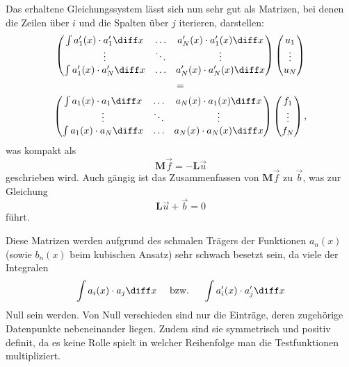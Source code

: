 Das erhaltene Gleichungssystem lässt sich nun sehr gut als Matrizen, bei denen die Zeilen über $i$ und die Spalten über $j$ iterieren, darstellen:
\begin{multline}
    \left(
        \begin{matrix}
            \int a'_1(x) \cdot a'_1 \diff x & \hdots & a'_N(x) \cdot a'_1(x) \diff x \\
            \vdots                          & \ddots & \vdots                        \\
            \int a'_1(x) \cdot a'_N \diff x & \hdots & a'_N(x) \cdot a'_N(x) \diff x \\
        \end{matrix}
    \right)
    \left(
        \begin{matrix}
            u_1 \\
            \vdots \\
            u_N
        \end{matrix}
    \right) \\
    = \\
    \left(
        \begin{matrix}
            \int a_1(x) \cdot a_1 \diff x & \hdots & a_N(x) \cdot a_1(x) \diff x \\
            \vdots                        & \ddots & \vdots                      \\
            \int a_1(x) \cdot a_N \diff x & \hdots & a_N(x) \cdot a_N(x) \diff x \\
        \end{matrix}
    \right)
    \left(
        \begin{matrix}
            f_1 \\
            \vdots \\
            f_N
        \end{matrix}
    \right),
\end{multline}
was kompakt als
\begin{equation}
    \mathbf{M}\vec{f} = -\mathbf{L}\vec{u}
\end{equation}
geschrieben wird.
Auch gängig ist das Zusammenfassen von $\mathbf{M}\vec{f}$ zu $\vec{b}$, was zur Gleichung
\begin{equation}
    \mathbf{L}\vec{u} + \vec{b} = 0
\end{equation}
führt.

Diese Matrizen werden aufgrund des schmalen Trägers der Funktionen $a_n(x)$ (sowie $b_n(x)$ beim kubischen Ansatz) sehr schwach besetzt sein, da viele der Integralen
\begin{equation}
    \int a_i(x) \cdot a_j \diff x \quad 
    \text{ bzw. } 
    \quad \int a'_i(x) \cdot a'_j \diff x 
\end{equation}
Null sein werden.
Von Null verschieden sind nur die Einträge, deren zugehörige Datenpunkte nebeneinander liegen.
Zudem sind sie symmetrisch und positiv definit, da es keine Rolle spielt in welcher Reihenfolge man die Testfunktionen multipliziert.

